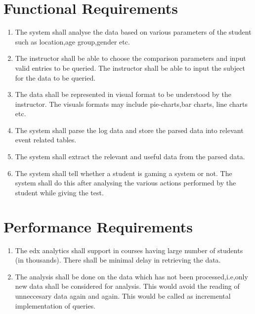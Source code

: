 \documentclass[a4paper,12pt,oneside]{sphinxmanual}
\begin{document}
\section{\textbf{Functional Requirements}}
\label{document:functional-requirements}\begin{enumerate}
\item {} 
The system shall analyse the data based on various parameters of the student such as location,age group,gender etc.

\item {} 
The instructor shall be able to choose the comparison parameters and input valid entries to be queried. The instructor shall be able to input the subject for the data to be queried.

\item {} 
The data shall be represented in visual format to be understood by the instructor. The visuals formats may include pie-charts,bar charts, line charts etc.

\item {} 
The system shall parse the log data and store the parsed data into relevant event related tables.

\item {} 
The system shall extract the relevant and useful data from the parsed data.

\item {} 
The system shall tell whether a student is gaming a system or not. The system shall do this after analysing the various actions performed by the student while giving the test.

\end{enumerate}


\section{\textbf{Performance Requirements}}
\label{document:performance-requirements}\begin{enumerate}
\item {} 
The edx analytics shall support in courses having large number of students (in thousands). There shall be minimal delay in retrieving the data.

\item {} 
The analysis shall be done on the data which has not been processed,i.e,only new data shall be considered for analysis. This would avoid the reading of unneccesary data again and again. This would be called as incremental implementation of queries.

\end{enumerate}
\end{document}
